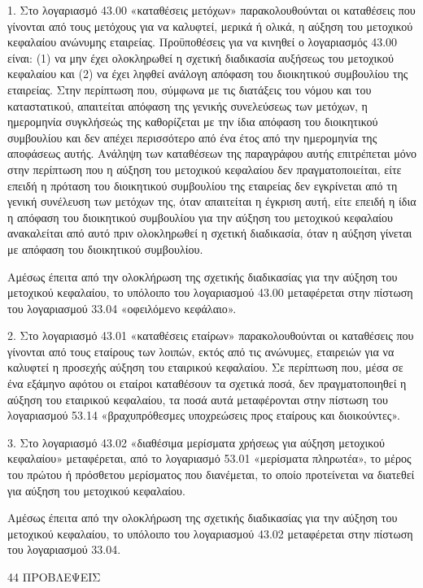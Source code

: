\documentclass[A4,10pt,greek]{book}
\begin{document}
1. Στο λογαριασμό 43.00 «καταθέσεις μετόχων» παρακολουθούνται οι καταθέσεις που γίνονται από τους μετόχους για να καλυφτεί, μερικά ή ολικά, η αύξηση του μετοχικού κεφαλαίου ανώνυμης εταιρείας. Προϋποθέσεις για να κινηθεί ο λογαριασμός 43.00 είναι: (1) να μην έχει ολοκληρωθεί η σχετική διαδικασία αυξήσεως του μετοχικού κεφαλαίου και (2) να έχει ληφθεί ανάλογη απόφαση του διοικητικού συμβουλίου της εταιρείας. Στην περίπτωση που, σύμφωνα με τις διατάξεις του νόμου και του καταστατικού, απαιτείται απόφαση της γενικής συνελεύσεως των μετόχων, η ημερομηνία συγκλήσεώς της καθορίζεται με την ίδια απόφαση του διοικητικού συμβουλίου και δεν απέχει περισσότερο από ένα έτος από την ημερομηνία της αποφάσεως αυτής. Ανάληψη των καταθέσεων της παραγράφου αυτής επιτρέπεται μόνο στην περίπτωση που η αύξηση του μετοχικού κεφαλαίου δεν πραγματοποιείται, είτε επειδή η πρόταση του διοικητικού συμβουλίου της εταιρείας δεν εγκρίνεται από τη γενική συνέλευση των μετόχων της, όταν απαιτείται η έγκριση αυτή, είτε επειδή η ίδια η απόφαση του διοικητικού συμβουλίου για την αύξηση του μετοχικού κεφαλαίου ανακαλείται από αυτό πριν ολοκληρωθεί η σχετική διαδικασία, όταν η αύξηση γίνεται με απόφαση του διοικητικού συμβουλίου.

Αμέσως έπειτα από την ολοκλήρωση της σχετικής διαδικασίας για την αύξηση του μετοχικού κεφαλαίου, το υπόλοιπο του λογαριασμού 43.00 μεταφέρεται στην πίστωση του λογαριασμού 33.04 «οφειλόμενο κεφάλαιο».

2. Στο λογαριασμό 43.01 «καταθέσεις εταίρων» παρακολουθούνται οι καταθέσεις που γίνονται από τους εταίρους των λοιπών, εκτός από τις ανώνυμες, εταιρειών για να καλυφτεί η προσεχής αύξηση του εταιρικού κεφαλαίου. Σε περίπτωση που, μέσα σε ένα εξάμηνο αφότου οι εταίροι καταθέσουν τα σχετικά ποσά, δεν πραγματοποιηθεί η αύξηση του εταιρικού κεφαλαίου, τα ποσά αυτά μεταφέρονται στην πίστωση του λογαριασμού 53.14 «βραχυπρόθεσμες υποχρεώσεις προς εταίρους και διοικούντες».

3. Στο λογαριασμό 43.02 «διαθέσιμα μερίσματα χρήσεως για αύξηση μετοχικού κεφαλαίου» μεταφέρεται, από το λογαριασμό 53.01 «μερίσματα πληρωτέα», το μέρος του πρώτου ή πρόσθετου μερίσματος που διανέμεται, το οποίο προτείνεται να διατεθεί για αύξηση του μετοχικού κεφαλαίου.

Αμέσως έπειτα από την ολοκλήρωση της σχετικής διαδικασίας για την αύξηση του μετοχικού κεφαλαίου, το υπόλοιπο του λογαριασμού 43.02 μεταφέρεται στην πίστωση του λογαριασμού 33.04.

 44   ΠΡΟΒΛΕΨΕΙΣ 
\end{document}

